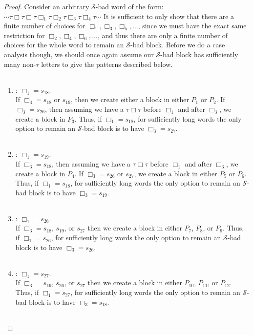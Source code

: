 \documentclass[11pt]{amsart}
\theoremstyle{definition}
\theoremstyle{remark}
\numberwithin{equation}{section}
\begin{document}
\begin{proof}
Consider an arbitrary $\mathcal{S}$-bad word of the form: $\cdots \tau \Box \tau \Box \tau \Box_{1} \tau \Box_{2} \tau \Box_{3} \tau \Box_{4} \tau \cdots $ It is sufficient to only show that there are a finite number of choices for $\Box_{1}, \Box_{3}, \Box_{5}, \ldots$, since we must have the exact same restriction for $\Box_{2}, \Box_{4}, \Box_{6}, \ldots$, and thus there are only a finite number of choices for the whole word to remain an $\mathcal{S}$-bad block. Before we do a case analysis though, we should once again assume our $\mathcal{S}$-bad block has sufficiently many non-$\tau$ letters to give the patterns described below. \\ \\
\begin{enumerate}
\item: $\Box_{1} = s_{18}$. \\ 
If $\Box_{3} = s_{18}$ or $s_{19}$, then we create either a block in either $P_{1}$ or $P_{2}$. If $\Box_{3} = s_{26}$, then assuming we have a $\tau \Box \tau$ before $\Box_{1}$ and after $\Box_{3}$, we create a block in $P_{3}$. Thus, if $\Box_{1} = s_{18}$, for sufficiently long words the only option to remain an $\mathcal{S}$-bad block is to have $\Box_{3} = s_{27}$. \\ \\
\item: $\Box_{1} = s_{19}$. \\
If $\Box_{3} = s_{18}$, then assuming we have a $\tau \Box \tau$ before $\Box_{1}$ and after $\Box_{3}$, we create a block in $P_{4}$. If $\Box_{3} = s_{26}$ or $s_{27}$, we create a block in either $P_{5}$ or $P_{6}$.  Thus, if $\Box_{1} = s_{18}$, for sufficiently long words the only option to remain an $\mathcal{S}$-bad block is to have $\Box_{3} = s_{19}$. \\ \\
\item: $\Box_{1} = s_{26}$. \\
If $\Box_{3} = s_{18}$, $s_{19}$, or $s_{27}$ then we create a block in either $P_{7}$, $P_{8}$, or $P_{9}$. Thus, if $\Box_{1} = s_{26}$, for sufficiently long words the only option to remain an $\mathcal{S}$-bad block is to have $\Box_{3} = s_{26}$. \\ \\
\item: $\Box_{1} = s_{27}$. \\
If $\Box_{3} = s_{19}$, $s_{26}$, or $s_{27}$ then we create a block in either $P_{10}$, $P_{11}$, or $P_{12}$. Thus, if $\Box_{1} = s_{27}$, for sufficiently long words the only option to remain an $\mathcal{S}$-bad block is to have $\Box_{3} = s_{18}$. \\ \\

\end{enumerate}
\end{proof}
\end{document}
